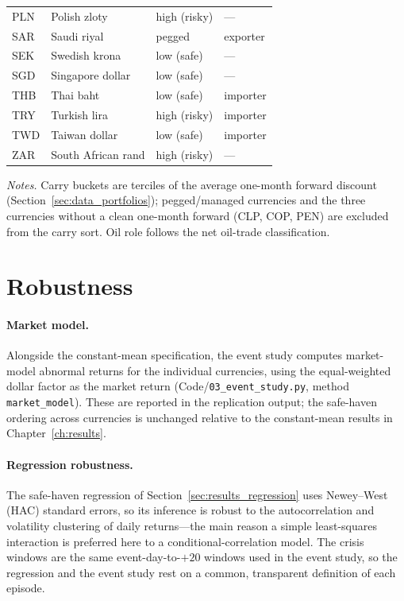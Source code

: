 \begin{table}[htbp]
\begin{threeparttable}
\begin{tabular}{ll l l}
PLN & Polish zloty        & high (risky)      & --- \\
SAR & Saudi riyal         & pegged            & exporter \\
SEK & Swedish krona       & low (safe)        & --- \\
SGD & Singapore dollar    & low (safe)        & --- \\
THB & Thai baht           & low (safe)        & importer \\
TRY & Turkish lira        & high (risky)      & importer \\
TWD & Taiwan dollar       & low (safe)        & importer \\
ZAR & South African rand  & high (risky)      & --- \\
\bottomrule
\end{tabular}
\begin{tablenotes}[flushleft]\footnotesize
\item \textit{Notes.} Carry buckets are terciles of the average one-month forward discount
(Section~\ref{sec:data_portfolios}); pegged/managed currencies and the three currencies
without a clean one-month forward (CLP, COP, PEN) are excluded from the carry sort. Oil role
follows the net oil-trade classification.
\end{tablenotes}
\end{threeparttable}
\end{table}

\section{Robustness}
\label{sec:app_robustness}

\paragraph{Market model.} Alongside the constant-mean specification, the event study computes
market-model abnormal returns for the individual currencies, using the equal-weighted dollar
factor as the market return (Code/\texttt{03\_event\_study.py}, method \texttt{market\_model}).
These are reported in the replication output; the safe-haven ordering across currencies is
unchanged relative to the constant-mean results in Chapter~\ref{ch:results}.

\paragraph{Regression robustness.} The safe-haven regression of
Section~\ref{sec:results_regression} uses Newey--West (HAC) standard errors, so its inference is
robust to the autocorrelation and volatility clustering of daily returns---the main reason a
simple least-squares interaction is preferred here to a conditional-correlation model. The
crisis windows are the same event-day-to-$+20$ windows used in the event study, so the
regression and the event study rest on a common, transparent definition of each episode.
